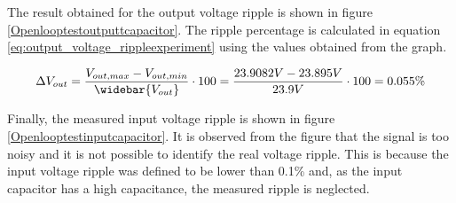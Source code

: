 The result obtained for the output voltage ripple is shown in figure \ref{Openlooptestoutputtcapacitor}. The ripple percentage is calculated in equation \ref{eq:output_voltage_rippleexperiment} using the values obtained from the graph. 

\begin{equation} \label{eq:output_voltage_rippleexperiment}
\Delta V_{out} = \frac{V_{out,max}-V_{out,min}}{\widebar{V_{out}}} \cdot 100 = \frac{23.9082V - 23.895V }{23.9V} \cdot 100 = 0.055\%
\end{equation}

Finally, the measured input voltage ripple is shown in figure \ref{Openlooptestinputcapacitor}. It is observed from the figure that the signal is too noisy and it is not possible to identify the real voltage ripple. This is because the input voltage ripple was defined to be lower than 0.1\% and, as the input capacitor has a high capacitance, the measured ripple is neglected. 


